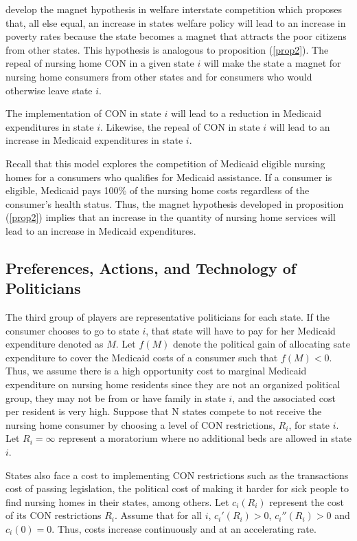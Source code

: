 \documentclass[../Main.tex]{subfiles}
\begin{document}
\citet{peterson1989american} develop the magnet hypothesis in welfare interstate competition which proposes that, all else equal, an increase in states welfare policy will lead to an increase in poverty rates because the state becomes a magnet that attracts the poor citizens from other states. This hypothesis is analogous to proposition (\ref{prop2}). The repeal of nursing home CON in a given state $i$ will make the state a magnet for nursing home consumers from other states and for consumers who would otherwise leave state $i$.

\begin{Proposition} \label{prop3}
The implementation of CON in state $i$ will lead to a reduction in Medicaid expenditures in state $i$. Likewise, the repeal of CON in state $i$ will lead to an increase in Medicaid expenditures in state $i$.  
\end{Proposition}

Recall that this model explores the competition of Medicaid eligible nursing homes for a consumers who qualifies for Medicaid assistance. If a consumer is eligible, Medicaid pays 100\% of the nursing home costs regardless of the consumer's health status. Thus, the magnet hypothesis developed in proposition (\ref{prop2}) implies that an increase in the quantity of nursing home services will lead to an increase in Medicaid expenditures.

\subsection{Preferences, Actions, and Technology of Politicians}

The third group of players are representative politicians for each state. If the consumer chooses to go to state $i$, that state will have to pay for her Medicaid expenditure denoted as $M$. Let $f(M)$ denote the political gain of allocating sate expenditure to cover the Medicaid costs of a consumer such that $f(M)<0$. Thus, we assume there is a high opportunity cost to marginal Medicaid expenditure on nursing home residents since they are not an organized political group, they may not be from or have family in state $i$, and the associated cost per resident is very high. Suppose that N states compete to not receive the nursing home consumer by choosing a level of CON restrictions, $R_i$, for state $i$. Let $R_i= \infty$ represent a moratorium where no additional beds are allowed in state $i$. 

States also face a cost to implementing CON restrictions such as the transactions cost of passing legislation, the political cost of making it harder for sick people to find nursing homes in their states, among others. Let $c_i(R_i)$ represent the cost of its CON restrictions $R_i$. Assume that for all $i$, $c_i'(R_i)>0$, $c_i''(R_i)>0$ and $c_i(0)=0$. Thus, costs increase continuously and at an accelerating rate.
\end{document}
